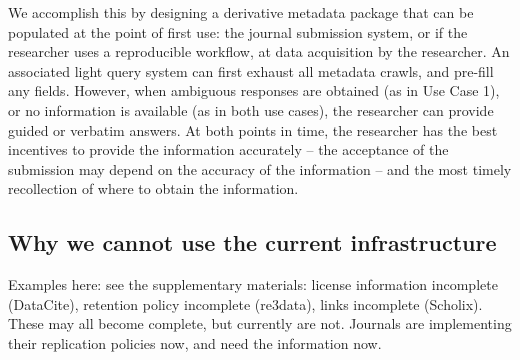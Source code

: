 We accomplish this by designing a derivative metadata package that can be populated at the point of first use: the journal submission system, or if the researcher uses a reproducible workflow, at data acquisition by the researcher. An associated light query system can first exhaust all metadata crawls, and pre-fill any fields. However, when ambiguous responses are obtained (as in Use Case 1), or no information is available (as in both use cases), the researcher can provide guided or verbatim answers. At both points in time, the researcher has the best incentives to provide the information accurately -- the acceptance of the submission may depend on the accuracy of the information -- and the most timely recollection of where to obtain the information.


\subsection{Why we cannot use the current infrastructure}
Examples here: see the supplementary materials: license information incomplete (DataCite), retention policy incomplete (re3data), links incomplete (Scholix). These may all become complete, but currently are not. Journals are implementing their replication policies now, and need the information now.